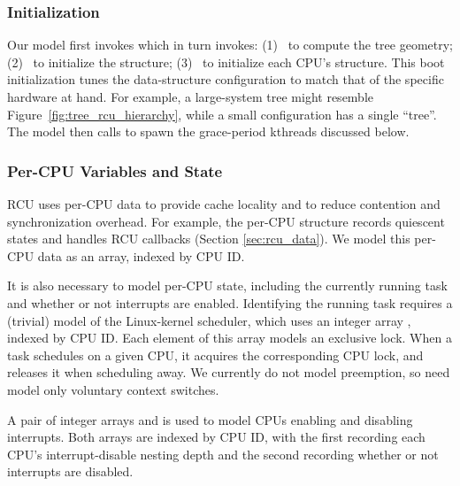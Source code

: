 
\subsubsection*{Initialization}

Our model first invokes  which in turn invokes:
(1)~ to compute the  tree geometry;
(2)~ to initialize the 
structure; (3)~ to initialize each CPU's
 structure.
This boot initialization tunes the data-structure configuration
to match that of the specific hardware at hand.
For example, a large-system tree might resemble
Figure~\ref{fig:tree_rcu_hierarchy}, while
a small configuration has a single  ``tree''.
The model then calls  
to spawn the grace-period kthreads discussed below.

\subsubsection*{Per-CPU Variables and State}

RCU uses per-CPU data to provide cache locality and to reduce 
contention and synchronization overhead.
For example, the per-CPU structure 
 records quiescent states 
and handles RCU callbacks (Section \ref{sec:rcu_data}). 
We model this per-CPU data as an array, indexed by CPU ID.

It is also necessary to model per-CPU state, including the currently
running task and whether or not interrupts are enabled.
Identifying the running task requires a (trivial)
model of the Linux-kernel scheduler, which
uses an integer array , indexed by CPU ID.
Each element of this array models an exclusive lock.
When a task schedules on a given CPU, it acquires the corresponding CPU lock,
and releases it when scheduling away.
We currently do not model preemption, so need model only voluntary context
switches.

A pair of integer arrays  and  is used
to model CPUs enabling and disabling interrupts.
Both arrays are indexed by CPU ID, with the first recording each CPU's
interrupt-disable nesting depth and the second recording whether
or not interrupts are disabled.

